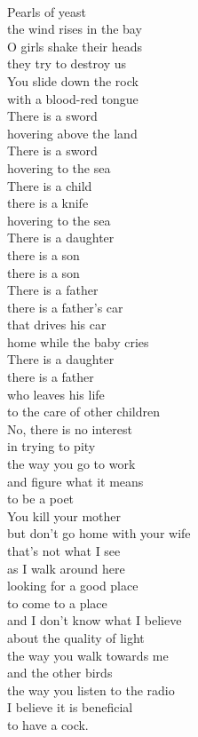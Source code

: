\documentclass[smalldemyvopaper,11pt,twoside,onecolumn,openright,extrafontsizes]{memoir}
\begin{document}
\\Pearls of yeast
\\the wind rises in the bay
\\O girls shake their heads
\\they try to destroy us
\\You slide down the rock
\\with a blood-red tongue
\\There is a sword
\\hovering above the land
\\There is a sword
\\hovering to the sea
\\There is a child
\\there is a knife
\\hovering to the sea
\\There is a daughter
\\there is a son
\\there is a son
\\There is a father
\\there is a father's car
\\that drives his car
\\home while the baby cries
\\There is a daughter
\\there is a father
\\who leaves his life
\\to the care of other children
\\No, there is no interest
\\in trying to pity
\\the way you go to work
\\and figure what it means
\\to be a poet
\\You kill your mother
\\but don't go home with your wife
\\that's not what I see
\\as I walk around here
\\looking for a good place
\\to come to a place
\\and I don't know what I believe
\\about the quality of light
\\the way you walk towards me
\\and the other birds
\\the way you listen to the radio
\\I believe it is beneficial
\\to have a cock.
\end{document}

